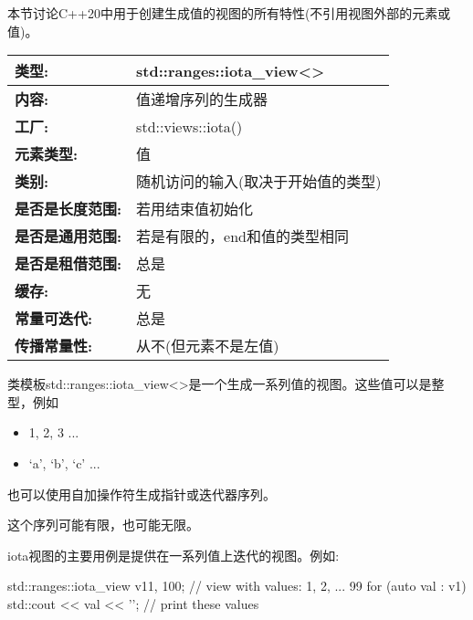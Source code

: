 
本节讨论C++20中用于创建生成值的视图的所有特性(不引用视图外部的元素或值)。


\begin{longtable}[c]{|l|l|}
\hline
\textbf{类型:}                 & std::ranges::iota\_view\textless{}\textgreater{} \\ \hline
\endfirsthead
%
\endhead
%
\textbf{内容:}              & 值递增序列的生成器  \\ \hline
\textbf{工厂:}              & std::views::iota()                               \\ \hline
\textbf{元素类型:}         & 值                                           \\ \hline
\textbf{类别:}        & 随机访问的输入(取决于开始值的类型) \\ \hline
\textbf{是否是长度范围:}       & 若用结束值初始化                 \\ \hline
\textbf{是否是通用范围:} & 若是有限的，end和值的类型相同         \\ \hline
\textbf{是否是租借范围:}    & 总是                                           \\ \hline
\textbf{缓存:}               & 无                                          \\ \hline
\textbf{常量可迭代:}       & 总是                                           \\ \hline
\textbf{传播常量性:} & 从不(但元素不是左值)              \\ \hline
\end{longtable}

类模板std::ranges::iota\_view<>是一个生成一系列值的视图。这些值可以是整型，例如

\begin{itemize}
\item
1, 2, 3 ...

\item
‘a’, ‘b’, ‘c’ ...
\end{itemize}

也可以使用自加操作符生成指针或迭代器序列。

这个序列可能有限，也可能无限。

iota视图的主要用例是提供在一系列值上迭代的视图。例如:

\begin{cpp}
std::ranges::iota_view v1{1, 100}; // view with values: 1, 2, ... 99
for (auto val : v1) {
	std::cout << val << '\n'; // print these values
}
\end{cpp}

